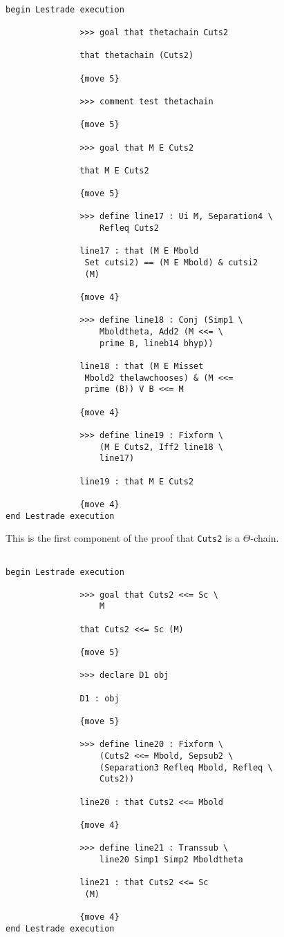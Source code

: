 \documentclass[12pt]{article}
\begin{document}
\begin{verbatim}

begin Lestrade execution

               >>> goal that thetachain Cuts2

               that thetachain (Cuts2)

               {move 5}

               >>> comment test thetachain

               {move 5}

               >>> goal that M E Cuts2

               that M E Cuts2

               {move 5}

               >>> define line17 : Ui M, Separation4 \
                   Refleq Cuts2

               line17 : that (M E Mbold 
                Set cutsi2) == (M E Mbold) & cutsi2 
                (M)

               {move 4}

               >>> define line18 : Conj (Simp1 \
                   Mboldtheta, Add2 (M <<= \
                   prime B, lineb14 bhyp))

               line18 : that (M E Misset 
                Mbold2 thelawchooses) & (M <<= 
                prime (B)) V B <<= M

               {move 4}

               >>> define line19 : Fixform \
                   (M E Cuts2, Iff2 line18 \
                   line17)

               line19 : that M E Cuts2

               {move 4}
end Lestrade execution
\end{verbatim}

This is the first component of the proof that {\tt Cuts2} is a $\Theta$-chain.

\begin{verbatim}

begin Lestrade execution

               >>> goal that Cuts2 <<= Sc \
                   M

               that Cuts2 <<= Sc (M)

               {move 5}

               >>> declare D1 obj

               D1 : obj

               {move 5}

               >>> define line20 : Fixform \
                   (Cuts2 <<= Mbold, Sepsub2 \
                   (Separation3 Refleq Mbold, Refleq \
                   Cuts2))

               line20 : that Cuts2 <<= Mbold

               {move 4}

               >>> define line21 : Transsub \
                   line20 Simp1 Simp2 Mboldtheta

               line21 : that Cuts2 <<= Sc 
                (M)

               {move 4}
end Lestrade execution
\end{verbatim}
\end{document}

